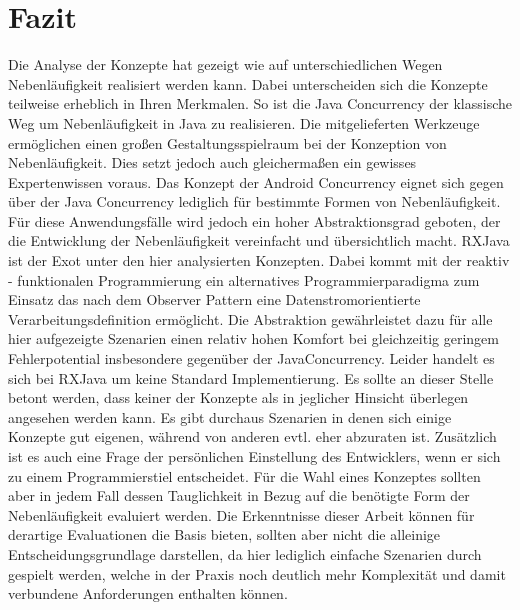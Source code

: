 \documentclass[12pt,oneside,a4paper,bibtotoc,liststotoc]{scrreprt}
\begin{document}
\section{Fazit}
Die Analyse der Konzepte hat gezeigt wie auf unterschiedlichen Wegen Nebenläufigkeit realisiert werden kann. Dabei unterscheiden sich die Konzepte teilweise erheblich in Ihren Merkmalen. So ist die Java Concurrency der klassische Weg um Nebenläufigkeit in Java zu realisieren. Die mitgelieferten Werkzeuge ermöglichen einen großen Gestaltungsspielraum bei der Konzeption von Nebenläufigkeit. Dies setzt jedoch auch gleichermaßen ein gewisses Expertenwissen voraus. Das Konzept der Android Concurrency eignet sich gegen über der Java Concurrency lediglich für bestimmte Formen von Nebenläufigkeit. Für diese Anwendungsfälle wird jedoch ein hoher Abstraktionsgrad geboten, der die Entwicklung der Nebenläufigkeit vereinfacht und übersichtlich macht. RXJava ist der Exot unter den hier analysierten Konzepten. Dabei kommt mit der reaktiv - funktionalen Programmierung ein alternatives Programmierparadigma zum Einsatz das nach dem Observer Pattern eine Datenstromorientierte Verarbeitungsdefinition ermöglicht. Die Abstraktion gewährleistet dazu für alle hier aufgezeigte Szenarien einen relativ hohen Komfort bei gleichzeitig geringem Fehlerpotential insbesondere gegenüber der JavaConcurrency. Leider handelt es sich bei RXJava um keine Standard Implementierung.\newline
Es sollte an dieser Stelle betont werden, dass keiner der Konzepte als in jeglicher Hinsicht überlegen angesehen werden kann. Es gibt durchaus Szenarien in denen sich einige Konzepte gut eigenen, während von anderen evtl. eher abzuraten ist. Zusätzlich ist es auch eine Frage der persönlichen Einstellung des Entwicklers, wenn er sich zu einem Programmierstiel entscheidet. Für die Wahl eines Konzeptes sollten aber in jedem Fall dessen Tauglichkeit in Bezug auf die benötigte Form der Nebenläufigkeit evaluiert werden. Die Erkenntnisse dieser Arbeit können für derartige Evaluationen die Basis bieten, sollten aber nicht die alleinige Entscheidungsgrundlage darstellen, da hier lediglich einfache Szenarien durch gespielt werden, welche in der Praxis noch deutlich mehr Komplexität und damit verbundene Anforderungen enthalten können. 
\end{document}
